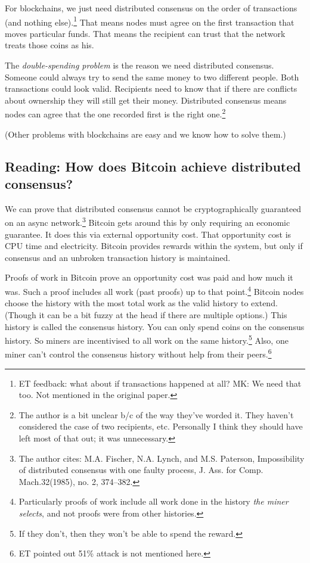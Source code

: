 \documentclass{article}
\begin{document}
For blockchains, we just need distributed consensus on the order of transactions (and nothing else).\footnote{ET feedback: what about if transactions happened at all? MK: We need that too. Not mentioned in the original paper.} That means nodes must agree on the first transaction that moves particular funds. That means the recipient can trust that the network treats those coins as his.

The \emph{double-spending problem} is the reason we need distributed consensus. Someone could always try to send the same money to two different people. Both transactions could look valid. Recipients need to know that if there are conflicts about ownership they will still get their money. Distributed consensus means nodes can agree that the one recorded first is the right one.\footnote{The author is a bit unclear b/c of the way they've worded it. They haven't considered the case of two recipients, etc. Personally I think they should have left most of that out; it was unnecessary.}

(Other problems with blockchains are easy and we know how to solve them.)

\subsection{Reading: How does Bitcoin achieve distributed consensus?}

We can prove that distributed consensus cannot be cryptographically guaranteed on an async network.\footnote{The author cites: M.A. Fischer, N.A. Lynch, and M.S. Paterson, Impossibility of distributed consensus with one faulty process, J. Ass. for Comp. Mach.32(1985), no. 2, 374–382.} Bitcoin gets around this by only requiring an economic guarantee. It does this via external opportunity cost. That opportunity cost is CPU time and electricity. Bitcoin provides rewards within the system, but only if consensus and an unbroken transaction history is maintained.

Proofs of work in Bitcoin prove an opportunity cost was paid and how much it was. Such a proof includes all work (past proofs) up to that point.\footnote{Particularly proofs of work include all work done in the history \emph{the miner selects}, and not proofs were from other histories.} Bitcoin nodes choose the history with the most total work as the valid history to extend. (Though it can be a bit fuzzy at the head if there are multiple options.) This history is called the consensus history. You can only spend coins on the consensus history. So miners are incentivised to all work on the same history.\footnote{If they don't, then they won't be able to spend the reward.} Also, one miner can't control the consensus history without help from their peers.\footnote{ET pointed out 51\% attack is not mentioned here.}
\end{document}
